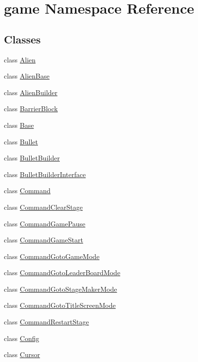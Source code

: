 \hypertarget{namespacegame}{}\section{game Namespace Reference}
\label{namespacegame}
\subsection*{Classes}
\begin{DoxyCompactItemize}
\item 
class \hyperlink{classgame_1_1Alien}{Alien}
\item 
class \hyperlink{classgame_1_1AlienBase}{Alien\+Base}
\item 
class \hyperlink{classgame_1_1AlienBuilder}{Alien\+Builder}
\item 
class \hyperlink{classgame_1_1BarrierBlock}{Barrier\+Block}
\item 
class \hyperlink{classgame_1_1Base}{Base}
\item 
class \hyperlink{classgame_1_1Bullet}{Bullet}
\item 
class \hyperlink{classgame_1_1BulletBuilder}{Bullet\+Builder}
\item 
class \hyperlink{classgame_1_1BulletBuilderInterface}{Bullet\+Builder\+Interface}
\item 
class \hyperlink{classgame_1_1Command}{Command}
\item 
class \hyperlink{classgame_1_1CommandClearStage}{Command\+Clear\+Stage}
\item 
class \hyperlink{classgame_1_1CommandGamePause}{Command\+Game\+Pause}
\item 
class \hyperlink{classgame_1_1CommandGameStart}{Command\+Game\+Start}
\item 
class \hyperlink{classgame_1_1CommandGotoGameMode}{Command\+Goto\+Game\+Mode}
\item 
class \hyperlink{classgame_1_1CommandGotoLeaderBoardMode}{Command\+Goto\+Leader\+Board\+Mode}
\item 
class \hyperlink{classgame_1_1CommandGotoStageMakerMode}{Command\+Goto\+Stage\+Maker\+Mode}
\item 
class \hyperlink{classgame_1_1CommandGotoTitleScreenMode}{Command\+Goto\+Title\+Screen\+Mode}
\item 
class \hyperlink{classgame_1_1CommandRestartStage}{Command\+Restart\+Stage}
\item 
class \hyperlink{classgame_1_1Config}{Config}
\item 
class \hyperlink{classgame_1_1Cursor}{Cursor}

\end{DoxyCompactItemize}

